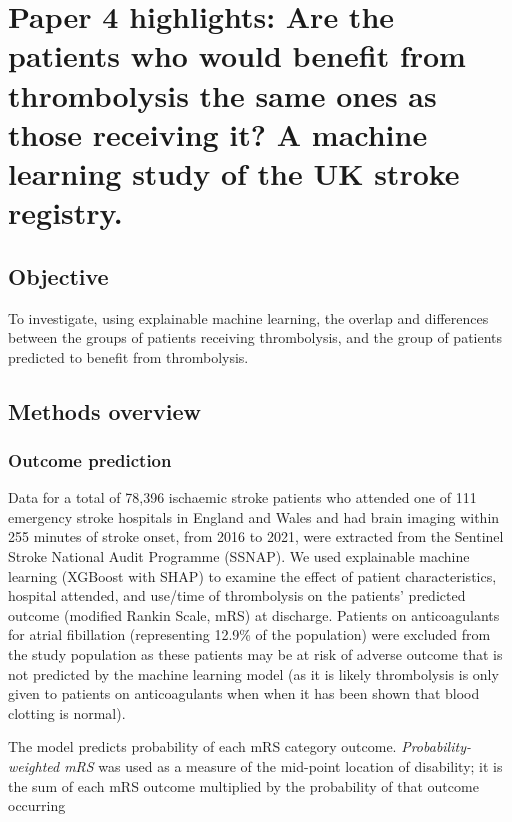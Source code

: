 
\section{Paper 4 highlights: Are the patients who would benefit from thrombolysis the same ones as those receiving it? A machine learning study of the UK stroke registry.\cite{pearn_are_2024}}\label{sec:paper_4}

\subsection{Objective}

To investigate, using explainable machine learning, the overlap and differences between the groups of patients receiving thrombolysis, and the group of patients predicted to benefit from thrombolysis.

\subsection{Methods overview}

\subsubsection{Outcome prediction}

Data for a total of 78,396 ischaemic stroke patients who attended one of 111 emergency stroke hospitals in England and Wales and had brain imaging within 255 minutes of stroke onset, from 2016 to 2021, were extracted from the Sentinel Stroke National Audit Programme (SSNAP). We used explainable machine learning (XGBoost\cite{chen_xgboost_2016} with SHAP\cite{lundberg_unified_2017}) to examine the effect of patient characteristics, hospital attended, and use/time of thrombolysis on the patients’ predicted outcome (modified Rankin Scale, mRS) at discharge. Patients on anticoagulants for atrial fibillation (representing 12.9\% of the population) were excluded from the study population as these patients may be at risk of adverse outcome that is not predicted by the machine learning model (as it is likely thrombolysis is only given to patients on anticoagulants when when it has been shown that blood clotting is normal).

The model predicts probability of each mRS category outcome.  \textit{Probability-weighted mRS} was used as a measure of the mid-point location of disability; it is the sum of each mRS outcome multiplied by the probability of that outcome occurring

